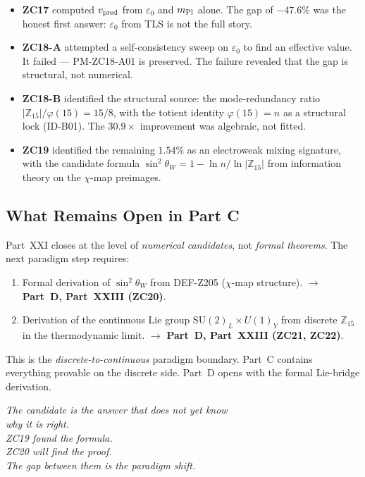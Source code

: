 \documentclass[12pt, a4paper]{article}
\begin{document}
\begin{itemize}[leftmargin=*]
\item \textbf{ZC17} computed $v_{\rm pred}$ from $\varepsilon_0$ and
  $m_{\rm Pl}$ alone. The gap of $-47.6\%$ was the honest first answer:
  $\varepsilon_0$ from TLS is not the full story.
\item \textbf{ZC18-A} attempted a self-consistency sweep on $\varepsilon_0$
  to find an effective value. It failed --- PM-ZC18-A01 is preserved.
  The failure revealed that the gap is structural, not numerical.
\item \textbf{ZC18-B} identified the structural source: the
  mode-redundancy ratio $|\mathbb{Z}_{15}|/\varphi(15) = 15/8$, with
  the totient identity $\varphi(15) = n$ as a structural lock
  (ID-B01). The $30.9\times$ improvement was algebraic, not fitted.
\item \textbf{ZC19} identified the remaining $1.54\%$ as an
  electroweak mixing signature, with the candidate formula
  $\sin^2\theta_W = 1 - \ln n / \ln|\mathbb{Z}_{15}|$ from
  information theory on the $\chi$-map preimages.
\end{itemize}

\subsection*{What Remains Open in Part C}

Part~XXI closes at the level of \emph{numerical candidates}, not
\emph{formal theorems}. The next paradigm step requires:
\begin{enumerate}[leftmargin=*, noitemsep]
\item Formal derivation of $\sin^2\theta_W$ from DEF-Z205
  ($\chi$-map structure). $\to$ \textbf{Part~D, Part~XXIII (ZC20)}.
\item Derivation of the continuous Lie group
  $\mathrm{SU}(2)_L \times U(1)_Y$ from discrete $\mathbb{Z}_{15}$
  in the thermodynamic limit. $\to$ \textbf{Part~D, Part~XXIII
  (ZC21, ZC22)}.
\end{enumerate}

This is the \emph{discrete-to-continuous} paradigm boundary. Part~C
contains everything provable on the discrete side. Part~D opens with
the formal Lie-bridge derivation.

\begin{center}
\textit{The candidate is the answer that does not yet know\\
why it is right.\\
ZC19 found the formula.\\
ZC20 will find the proof.\\
The gap between them is the paradigm shift.}
\end{center}
\end{document}
